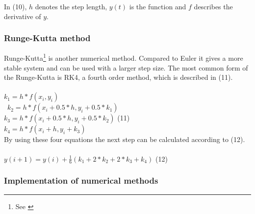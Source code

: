 \documentclass[a4paper,12pt,twoside,english]{article}
\begin{document}
In (10), $h$ denotes the step length, $y(t)$ is the function and $f$ describes the derivative of $y$.
\subsubsection{Runge-Kutta method}
Runge-Kutta\footnote{See \cite{Mat:04}} is another numerical method. Compared to Euler it gives a more stable system and can be used with a larger step size. The most common form of the Runge-Kutta is RK4, a fourth order method, which is described in (11).\\ \\
$k_1 = h*f(x_i, y_i) $ \\ \
$k_2 = h*f(x_i + 0.5*h, y_i + 0.5*k_1) $ \\
$k_3 = h*f(x_i + 0.5*h, y_i + 0.5*k_2)$ \hfill (11) \\
$k_4 = h*f(x_i + h, y_i + k_3)$ \\

By using these four equations the next step can be calculated according to (12). \\ \\
$ y(i+1) = y(i) + \frac{1}{6}( k_1 + 2*k_2 + 2*k_3 + k_4) $ \hfill (12)

\subsubsection{Implementation of numerical methods}
\end{document}
